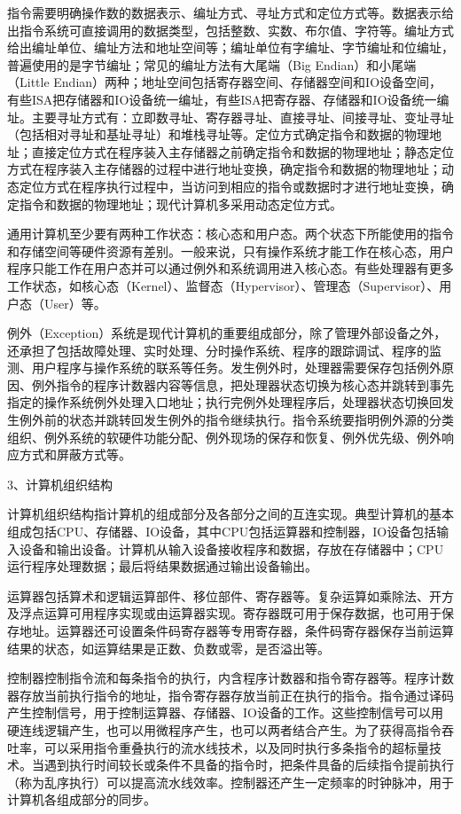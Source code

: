 \documentclass[]{ctexbook}
\begin{document}
指令需要明确操作数的数据表示、编址方式、寻址方式和定位方式等。数据表示给出指令系统可直接调用的数据类型，包括整数、实数、布尔值、字符等。编址方式给出编址单位、编址方法和地址空间等；编址单位有字编址、字节编址和位编址，普遍使用的是字节编址；常见的编址方法有大尾端（Big Endian）和小尾端（Little Endian）两种；地址空间包括寄存器空间、存储器空间和IO设备空间，有些ISA把存储器和IO设备统一编址，有些ISA把寄存器、存储器和IO设备统一编址。主要寻址方式有：立即数寻址、寄存器寻址、直接寻址、间接寻址、变址寻址（包括相对寻址和基址寻址）和堆栈寻址等。定位方式确定指令和数据的物理地址；直接定位方式在程序装入主存储器之前确定指令和数据的物理地址；静态定位方式在程序装入主存储器的过程中进行地址变换，确定指令和数据的物理地址；动态定位方式在程序执行过程中，当访问到相应的指令或数据时才进行地址变换，确定指令和数据的物理地址；现代计算机多采用动态定位方式。

通用计算机至少要有两种工作状态：核心态和用户态。两个状态下所能使用的指令和存储空间等硬件资源有差别。一般来说，只有操作系统才能工作在核心态，用户程序只能工作在用户态并可以通过例外和系统调用进入核心态。有些处理器有更多工作状态，如核心态（Kernel）、监督态（Hypervisor）、管理态（Supervisor）、用户态（User）等。

例外（Exception）系统是现代计算机的重要组成部分，除了管理外部设备之外，还承担了包括故障处理、实时处理、分时操作系统、程序的跟踪调试、程序的监测、用户程序与操作系统的联系等任务。发生例外时，处理器需要保存包括例外原因、例外指令的程序计数器内容等信息，把处理器状态切换为核心态并跳转到事先指定的操作系统例外处理入口地址；执行完例外处理程序后，处理器状态切换回发生例外前的状态并跳转回发生例外的指令继续执行。指令系统要指明例外源的分类组织、例外系统的软硬件功能分配、例外现场的保存和恢复、例外优先级、例外响应方式和屏蔽方式等。

3、计算机组织结构

计算机组织结构指计算机的组成部分及各部分之间的互连实现。典型计算机的基本组成包括CPU、存储器、IO设备，其中CPU包括运算器和控制器，IO设备包括输入设备和输出设备。计算机从输入设备接收程序和数据，存放在存储器中；CPU运行程序处理数据；最后将结果数据通过输出设备输出。

运算器包括算术和逻辑运算部件、移位部件、寄存器等。复杂运算如乘除法、开方及浮点运算可用程序实现或由运算器实现。寄存器既可用于保存数据，也可用于保存地址。运算器还可设置条件码寄存器等专用寄存器，条件码寄存器保存当前运算结果的状态，如运算结果是正数、负数或零，是否溢出等。

控制器控制指令流和每条指令的执行，内含程序计数器和指令寄存器等。程序计数器存放当前执行指令的地址，指令寄存器存放当前正在执行的指令。指令通过译码产生控制信号，用于控制运算器、存储器、IO设备的工作。这些控制信号可以用硬连线逻辑产生，也可以用微程序产生，也可以两者结合产生。为了获得高指令吞吐率，可以采用指令重叠执行的流水线技术，以及同时执行多条指令的超标量技术。当遇到执行时间较长或条件不具备的指令时，把条件具备的后续指令提前执行（称为乱序执行）可以提高流水线效率。控制器还产生一定频率的时钟脉冲，用于计算机各组成部分的同步。
\end{document}
